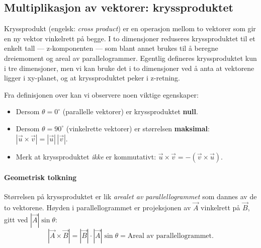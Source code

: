 

\subsection*{Multiplikasjon av vektorer: kryssproduktet}
Kryssprodukt (engelsk: \textit{cross product}) er en operasjon mellom to vektorer som gir en ny vektor vinkelrett på begge. I to dimensjoner reduseres kryssproduktet til et enkelt tall — z-komponenten — som blant annet brukes til å beregne dreiemoment og areal av parallelogrammer. Egentlig defineres kryssproduktet kun i tre dimensjoner, men vi kan bruke det i to dimensjoner ved å anta at vektorene ligger i xy-planet, og at kryssproduktet peker i z-retning.


Fra definisjonen over kan vi observere noen viktige egenskaper:
\begin{itemize}
    \item Dersom $\theta = 0^\circ$ (parallelle vektorer) er kryssproduktet \textbf{null}.
    \item Dersom $\theta = 90^\circ$ (vinkelrette vektorer) er størrelsen \textbf{maksimal}: $|\vec{u}\times\vec{v}|=|\vec{u}|\,|\vec{v}|$.
    \item Merk at kryssproduktet \emph{ikke} er kommutativt: $\vec{u}\times\vec{v} = -(\vec{v}\times\vec{u})$.
\end{itemize}

\paragraph{Geometrisk tolkning}

Størrelsen på kryssproduktet er lik \emph{arealet av parallellogrammet} som dannes av de to vektorene. Høyden i parallellogrammet er projeksjonen av $\vec{A}$ vinkelrett på $\vec{B}$, gitt ved $|\vec{A}|\sin\theta$:
\[
|\vec{A}\times\vec{B}| = |\vec{B}| \cdot |\vec{A}|\sin\theta = \text{Areal av parallellogrammet.}
\]

